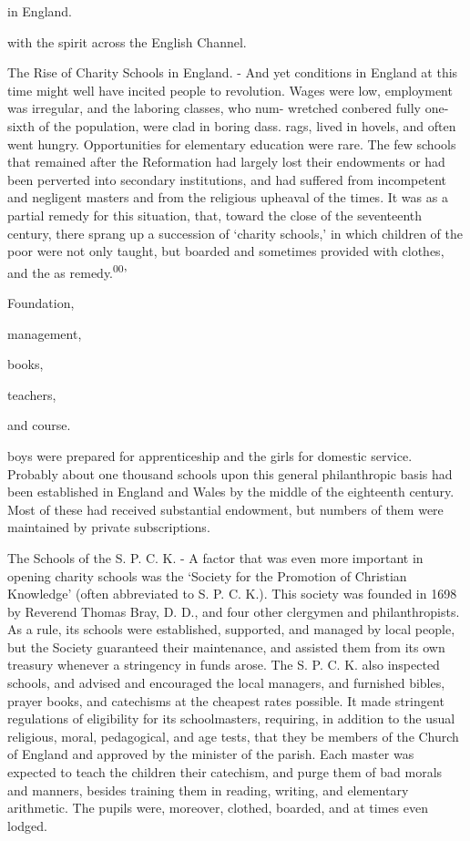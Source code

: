 \documentclass[]{book}
\begin{document}
in England.

with the spirit across the English Channel.

The Rise of Charity Schools in England. - And yet conditions in England at this time might well have incited people to revolution. Wages were low, employment was irregular, and the laboring classes, who num- wretched conbered fully one-sixth of the population, were clad in boring dass. rags, lived in hovels, and often went hungry. Opportunities for elementary education were rare. The few schools that remained after the Reformation had largely lost their endowments or had been perverted into secondary institutions, and had suffered from incompetent and negligent masters and from the religious upheaval of the times. It was as a partial remedy for this situation, that, toward the close of the seventeenth century, there sprang up a succession of `charity schools,' in which children of the poor were not only taught, but boarded and sometimes provided with clothes, and the as remedy.\textsuperscript{00}'

Foundation,

management,

books,

teachers,

and course.

boys were prepared for apprenticeship and the girls for domestic service. Probably about one thousand schools upon this general philanthropic basis had been established in England and Wales by the middle of the eighteenth century. Most of these had received substantial endowment, but numbers of them were maintained by private subscriptions.

The Schools of the S. P. C. K. - A factor that was even more important in opening charity schools was the `Society for the Promotion of Christian Knowledge' (often abbreviated to S. P. C. K.). This society was founded in 1698 by Reverend Thomas Bray, D. D., and four other clergymen and philanthropists. As a rule, its schools were established, supported, and managed by local people, but the Society guaranteed their maintenance, and assisted them from its own treasury whenever a stringency in funds arose. The S. P. C. K. also inspected schools, and advised and encouraged the local managers, and furnished bibles, prayer books, and catechisms at the cheapest rates possible. It made stringent regulations of eligibility for its schoolmasters, requiring, in addition to the usual religious, moral, pedagogical, and age tests, that they be members of the Church of England and approved by the minister of the parish. Each master was expected to teach the children their catechism, and purge them of bad morals and manners, besides training them in reading, writing, and elementary arithmetic. The pupils were, moreover, clothed, boarded, and at times even lodged.
\end{document}
